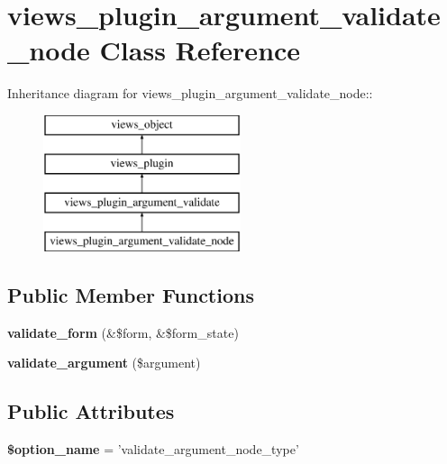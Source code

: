\hypertarget{classviews__plugin__argument__validate__node}{
\section{views\_\-plugin\_\-argument\_\-validate\_\-node Class Reference}
\label{classviews__plugin__argument__validate__node}
}
Inheritance diagram for views\_\-plugin\_\-argument\_\-validate\_\-node::\begin{figure}[H]
\begin{center}
\leavevmode
\includegraphics[height=4cm]{classviews__plugin__argument__validate__node}
\end{center}
\end{figure}
\subsection*{Public Member Functions}
\begin{CompactItemize}
\item 
\hypertarget{classviews__plugin__argument__validate__node_1e3c815510b286f622602e161fc474ae}{
\textbf{validate\_\-form} (\&\$form, \&\$form\_\-state)}
\label{classviews__plugin__argument__validate__node_1e3c815510b286f622602e161fc474ae}

\item 
\hypertarget{classviews__plugin__argument__validate__node_d8058fa933969f0671dfa4075fe49336}{
\textbf{validate\_\-argument} (\$argument)}
\label{classviews__plugin__argument__validate__node_d8058fa933969f0671dfa4075fe49336}

\end{CompactItemize}
\subsection*{Public Attributes}
\begin{CompactItemize}
\item 
\hypertarget{classviews__plugin__argument__validate__node_141e6670cb637d542378c989e927fac2}{
\textbf{\$option\_\-name} = 'validate\_\-argument\_\-node\_\-type'}
\label{classviews__plugin__argument__validate__node_141e6670cb637d542378c989e927fac2}

\end{CompactItemize}


